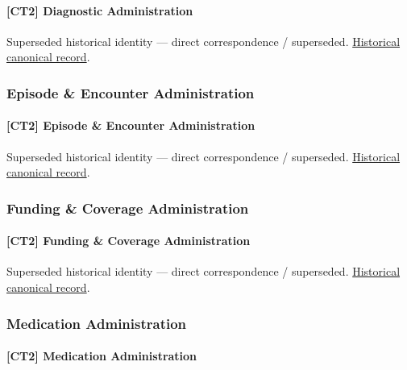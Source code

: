 \paragraph{[CT2] Diagnostic Administration}

\par\label{element:2b1a27d5d9944e05b4cf0fcaad4ca433}
Superseded historical identity — direct correspondence / superseded. \href{../../../../continuum/strategy/capability/2b1a27d5d9944e05b4cf0fcaad4ca433.md}{Historical canonical record}.\par

\subsubsection{Episode \& Encounter Administration}

\paragraph{[CT2] Episode \& Encounter Administration}

\par\label{element:2778f988e8d44e3091749542c39d38a4}
Superseded historical identity — direct correspondence / superseded. \href{../../../../continuum/strategy/capability/2778f988e8d44e3091749542c39d38a4.md}{Historical canonical record}.\par

\subsubsection{Funding \& Coverage Administration}

\paragraph{[CT2] Funding \& Coverage Administration}

\par\label{element:58beafcbcd084331be710eb00d27f6cf}
Superseded historical identity — direct correspondence / superseded. \href{../../../../continuum/strategy/capability/58beafcbcd084331be710eb00d27f6cf.md}{Historical canonical record}.\par

\subsubsection{Medication Administration}

\paragraph{[CT2] Medication Administration}

